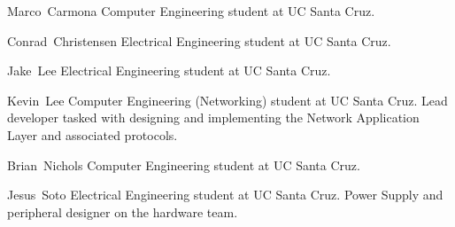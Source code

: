\documentclass[journal,compsoc]{IEEEtran}
\begin{document}
\begin{IEEEbiography}{Marco~Carmona}
  Computer Engineering student at UC Santa Cruz.
\end{IEEEbiography}

\begin{IEEEbiography}
{Conrad~Christensen}
  Electrical Engineering student at UC Santa Cruz.
\end{IEEEbiography}

\begin{IEEEbiography}{Jake~Lee}
  Electrical Engineering student at UC Santa Cruz.
\end{IEEEbiography}

\begin{IEEEbiography}
{Kevin~Lee}
  Computer Engineering (Networking) student at UC Santa Cruz. Lead developer tasked with designing and implementing the Network Application Layer and associated protocols.
\end{IEEEbiography}

\begin{IEEEbiography}{Brian~Nichols}
  Computer Engineering student at UC Santa Cruz.
\end{IEEEbiography}

\begin{IEEEbiography}{Jesus~Soto}
  Electrical Engineering student at UC Santa Cruz. Power Supply and peripheral designer on the hardware team. 
\end{IEEEbiography}
\end{document}
